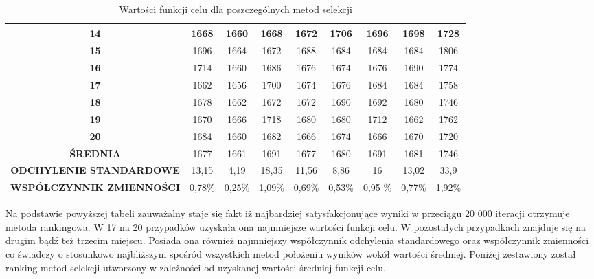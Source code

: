 \begin{itemize}
\begin{table}[h!]
\begin{center}
{\begin{tabular}{|c|c|c|c|c|c|c|c|c|}
\hline
 \textbf{14}&1668&1660&1668&1672&1706&1696&1698&1728\\
\hline
 \textbf{15}&1696&1664&1672&1688&1684&1684&1684&1806\\
\hline
 \textbf{16}&1714&1660&1686&1676&1674&1676&1690&1774\\
\hline
 \textbf{17}&1662&1656&1700&1674&1676&1684&1684&1758 \\
\hline
 \textbf{18}&1678&1662&1672&1672&1690&1692&1680&1746\\
\hline
 \textbf{19}&1670&1666&1718&1680&1680&1712&1662&1762\\
\hline
 \textbf{20}&1684&1660&1682&1666&1674&1666&1670&1720\\
\hline
 \textbf{ŚREDNIA}&1677&1661&1691&1677&1680&1691&1681&1746\\
\hline
 \textbf{ODCHYLENIE STANDARDOWE}&13,15&4,19&18,35&11,56&8,86&16&13,02&33,9\\
\hline
 \textbf{WSPÓŁCZYNNIK ZMIENNOŚCI}&0,78\%&0,25\%&1,09\%&0,69\%&0,53\%&0,95	\%&0,77\%&1,92\%\\
\hline
\end{tabular}}
\caption{Wartości funkcji celu dla poszczególnych metod selekcji}
\label{instancja1}
\end{center}
\end{table}


Na podstawie powyższej tabeli zauważalny staje się fakt iż najbardziej satysfakcjonujące wyniki w przeciągu 20 000 iteracji otrzymuje metoda rankingowa. W 17 na 20 przypadków uzyskała ona najmniejsze wartości funkcji celu. W pozostałych przypadkach znajduje się na drugim bądź też trzecim miejscu. Posiada ona również najmniejszy współczynnik odchylenia standardowego oraz współczynnik zmienności co świadczy o stosunkowo najbliższym spośród wszystkich metod położeniu wyników wokół wartości średniej. Poniżej zestawiony został ranking metod selekcji utworzony w zależności od uzyskanej wartości średniej funkcji celu.\\




\end{itemize}
